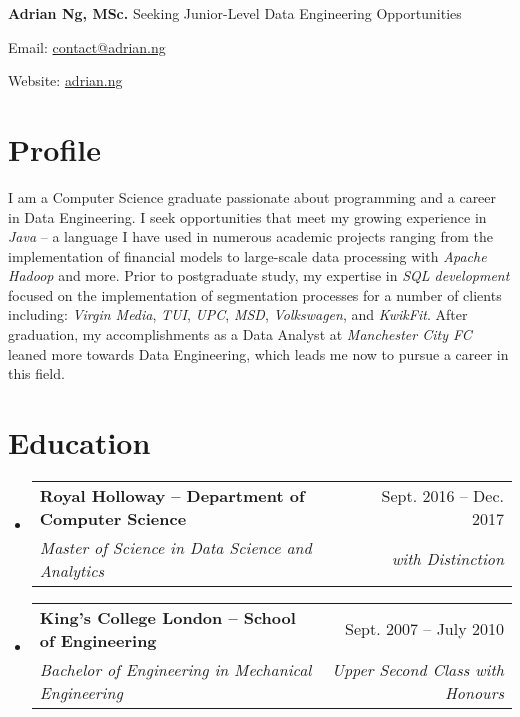 \documentclass[letterpaper,11pt]{article}
\makeatletter
\newcommand{\resumeSubheading}[4]{
	\vspace{-1pt}\item
	\begin{tabular*}{0.97\textwidth}{l@{\extracolsep{\fill}}r}
		\textbf{#1} & #2 \\
		\textit{\small#3} & \textit{\small #4} \\
	\end{tabular*}\vspace{-5pt}
}
\newcommand{\resumeSubHeadingListStart}{\begin{itemize}[leftmargin=*]}
\newcommand{\resumeSubHeadingListEnd}{\end{itemize}}
\makeatother
\begin{document}
\noindent
\Large \textbf{Adrian Ng, MSc.}
\newline
\small
Seeking Junior-Level Data Engineering Opportunities
\hfill
\begin{description*}
	\item [Email:] \href{mailto:contact@adrian.ng}{contact@adrian.ng}
	\item [Website:] \href{https://adrian.ng}{adrian.ng}
\end{description*}
\section{Profile}
\begin{paragraph}
	I am a Computer Science graduate passionate about programming and a career in Data Engineering. I seek opportunities that meet my growing experience in \textit{Java} -- a language I have used in numerous academic projects ranging from the implementation of financial models to large-scale data processing with \textit{Apache Hadoop} and more.
	\noindent
	\newline
	Prior to postgraduate study, my expertise in \textit{SQL development} focused on the implementation of segmentation processes for a number of clients including: \textit{Virgin Media}, \textit{TUI}, \textit{UPC}, \textit{MSD}, \textit{Volkswagen}, and \textit{KwikFit}.
	\noindent
	\newline
	After graduation, my accomplishments as a Data Analyst at \textit{Manchester City FC} leaned more towards Data Engineering, which leads me now to pursue a career in this field.
\end{paragraph}
\section{Education}
\resumeSubHeadingListStart

\resumeSubheading
{Royal Holloway -- Department of Computer Science}{Sept. 2016 -- Dec. 2017}
{Master of Science in Data Science and Analytics}{with Distinction}

\resumeSubheading
{King's College London -- School of Engineering}{Sept. 2007 -- July 2010}
{Bachelor of Engineering in Mechanical Engineering}{Upper Second Class with Honours}

\resumeSubHeadingListEnd
\end{document}
